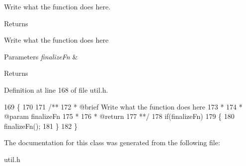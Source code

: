 Write what the function does here. 

\begin{DoxyReturn}{Returns}

\end{DoxyReturn}
Write what the function does here


\begin{DoxyParams}{Parameters}
{\em finalize\+Fn} & \\
\hline
\end{DoxyParams}
\begin{DoxyReturn}{Returns}

\end{DoxyReturn}


Definition at line 168 of file util.\+h.


\begin{DoxyCode}
169         \{
170 \textcolor{comment}{}
171 \textcolor{comment}{            /**}
172 \textcolor{comment}{             * @brief Write what the function does here}
173 \textcolor{comment}{             *}
174 \textcolor{comment}{             * @param finalizeFn}
175 \textcolor{comment}{             *}
176 \textcolor{comment}{             * @return}
177 \textcolor{comment}{             **/}
178             \textcolor{keywordflow}{if}(finalizeFn)
179             \{
180                 finalizeFn();
181             \}
182         \}
\end{DoxyCode}


The documentation for this class was generated from the following file\+:\begin{DoxyCompactItemize}
\item 
util.\+h\end{DoxyCompactItemize}
